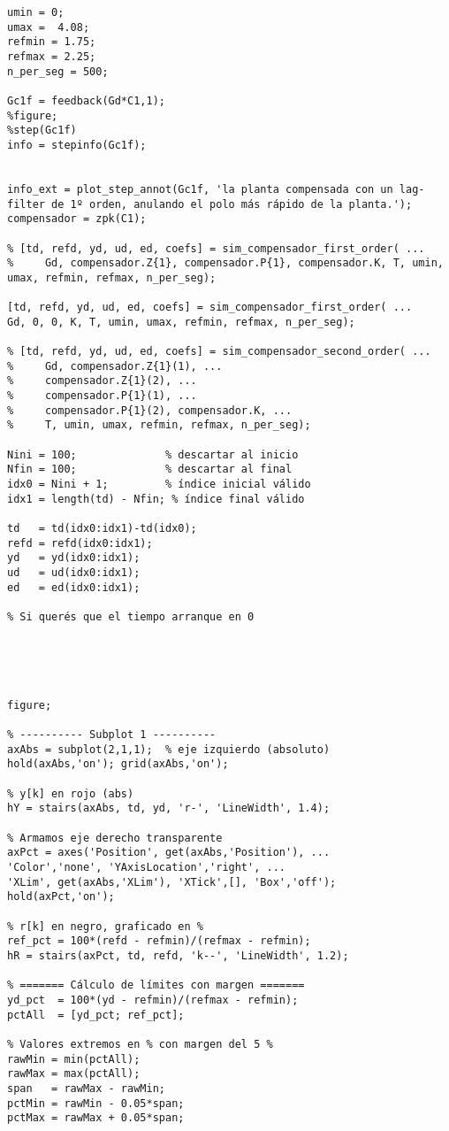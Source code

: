 \begin{lstlisting}[style=matlabstyle,caption={Hoja cálculos utilizada para el diseño de los compensadores.},label={matlab:hojaDeCalculos}]
umin = 0;
umax =  4.08;
refmin = 1.75;
refmax = 2.25;
n_per_seg = 500;

Gc1f = feedback(Gd*C1,1);
%figure;
%step(Gc1f)
info = stepinfo(Gc1f);


info_ext = plot_step_annot(Gc1f, 'la planta compensada con un lag-filter de 1º orden, anulando el polo más rápido de la planta.');
compensador = zpk(C1);

% [td, refd, yd, ud, ed, coefs] = sim_compensador_first_order( ...
%     Gd, compensador.Z{1}, compensador.P{1}, compensador.K, T, umin, umax, refmin, refmax, n_per_seg);

[td, refd, yd, ud, ed, coefs] = sim_compensador_first_order( ...
Gd, 0, 0, K, T, umin, umax, refmin, refmax, n_per_seg);

% [td, refd, yd, ud, ed, coefs] = sim_compensador_second_order( ...
%     Gd, compensador.Z{1}(1), ...
%     compensador.Z{1}(2), ...
%     compensador.P{1}(1), ...
%     compensador.P{1}(2), compensador.K, ...
%     T, umin, umax, refmin, refmax, n_per_seg);

Nini = 100;              % descartar al inicio
Nfin = 100;              % descartar al final
idx0 = Nini + 1;         % índice inicial válido
idx1 = length(td) - Nfin; % índice final válido

td   = td(idx0:idx1)-td(idx0);
refd = refd(idx0:idx1);
yd   = yd(idx0:idx1);
ud   = ud(idx0:idx1);
ed   = ed(idx0:idx1);

% Si querés que el tiempo arranque en 0





figure;

% ---------- Subplot 1 ----------
axAbs = subplot(2,1,1);  % eje izquierdo (absoluto)
hold(axAbs,'on'); grid(axAbs,'on');

% y[k] en rojo (abs)
hY = stairs(axAbs, td, yd, 'r-', 'LineWidth', 1.4);

% Armamos eje derecho transparente
axPct = axes('Position', get(axAbs,'Position'), ...
'Color','none', 'YAxisLocation','right', ...
'XLim', get(axAbs,'XLim'), 'XTick',[], 'Box','off');
hold(axPct,'on');

% r[k] en negro, graficado en %
ref_pct = 100*(refd - refmin)/(refmax - refmin);
hR = stairs(axPct, td, refd, 'k--', 'LineWidth', 1.2);

% ======= Cálculo de límites con margen =======
yd_pct  = 100*(yd - refmin)/(refmax - refmin);
pctAll  = [yd_pct; ref_pct];

% Valores extremos en % con margen del 5 %
rawMin = min(pctAll);
rawMax = max(pctAll);
span   = rawMax - rawMin;
pctMin = rawMin - 0.05*span;
pctMax = rawMax + 0.05*span;


\end{lstlisting}
